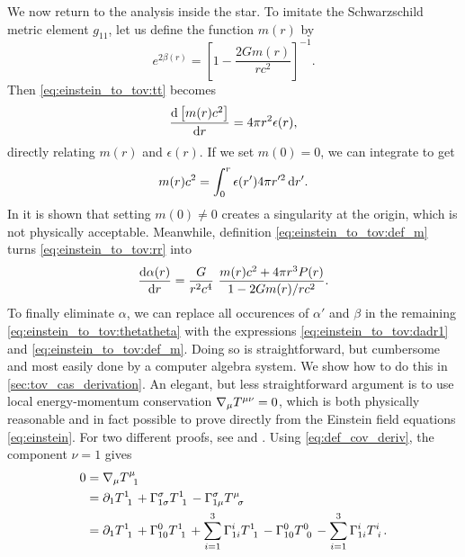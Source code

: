 We now return to the analysis inside the star.
To imitate the Schwarzschild metric element $g_{11}$, let us define the function $m(r)$ by
\begin{equation}
	e^{2 \beta(r)} = \left[ 1 - \frac{2 G m(r)}{r c^2} \right]^{-1} .
	\label{eq:einstein_to_tov:def_m}
\end{equation}
Then \cref{eq:einstein_to_tov:tt} becomes
\begin{equation}
	\odv{\left[m(r) c^2\right]}{r} = 4 \pi r^2 \epsilon(r) ,
	\label{eq:einstein_to_tov:m_rho}
\end{equation}
directly relating $m(r)$ and $\epsilon(r)$.
If we set $m(0) = 0$, we can integrate to get
\begin{equation}
	m(r) c^2 = \integral{\epsilon(r') 4 \pi r'^2}{r'}{0}{r} .
	\label{eq:einstein_to_tov:m_integral}
\end{equation}
In \cite[page 602]{ref:mtw} it is shown that setting $m(0) \neq 0$ creates a singularity at the origin, which is not physically acceptable.
Meanwhile, definition \eqref{eq:einstein_to_tov:def_m} turns \cref{eq:einstein_to_tov:rr} into
\begin{equation}
	\odv{\alpha(r)}{r} = \frac{G}{r^2 c^4} \frac{m(r) c^2 + 4 \pi r^3 P(r)}{1 - 2 G m(r) / r c^2} .
	\label{eq:einstein_to_tov:dadr1}
\end{equation}
To finally eliminate $\alpha$, we can replace all occurences of $\alpha'$ and $\beta$ in the remaining \cref{eq:einstein_to_tov:thetatheta} with the expressions \eqref{eq:einstein_to_tov:dadr1} and \eqref{eq:einstein_to_tov:def_m}.
Doing so is straightforward, but cumbersome and most easily done by a computer algebra system.
We show how to do this in \cref{sec:tov_cas_derivation}.
An elegant, but less straightforward argument is to use local energy-momentum conservation $\nabla_\mu T\indices{^\mu^\nu} = 0$, which is both physically reasonable and in fact possible to prove directly from the Einstein field equations \eqref{eq:einstein}.
For two different proofs, see \cite{ref:einstein_conservation_energy_momentum} and \cite[section 8.3.2]{ref:mika_gr_notes}.
Using \cref{eq:def_cov_deriv}, the component $\nu=1$ gives
\begin{equation*}
\begin{split}
	0 &= \nabla_\mu T\indices{^\mu_1} \\
	  &= \partial_1 T\indices{^1_1} + \Gamma^\sigma_{1 \sigma} T\indices{^1_1} - \Gamma^\sigma_{1 \mu} T\indices{^\mu_\sigma} \\
	  &= \partial_1 T\indices{^1_1} + \Gamma^0_{10} T\indices{^1_1} + \sum_{i=1}^3 \Gamma^i_{1i} T\indices{^1_1} - \Gamma^0_{10} T\indices{^0_0} - \sum_{i=1}^3 \Gamma^i_{1i} T\indices{^i_i} . \\
\end{split}
\end{equation*}
